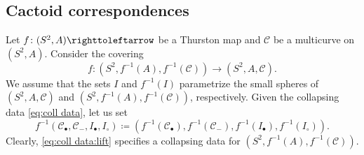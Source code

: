 \documentclass{amsart}
\theoremstyle{plain}
\theoremstyle{definition}
\theoremstyle{remark}
\newcommand{\CC}{{\mathcal C}}
\newcommand\selfmap{\righttoleftarrow}
\begin{document}



\subsection{Cactoid correspondences}
\label{ss:bar f}


Let $f\colon (S^2,A) \selfmap$ be a Thurston map and $\CC$ be a multicurve on $(S^2,A)$. Consider the covering 
\begin{equation}
\label{eq:preCactoid:f}
f\colon (S^2,f^{-1}(A),f^{-1}(\CC)) \to (S^2,A,\CC).
\end{equation}
We assume that the sets $I$ and $f^{-1}(I)$ parametrize the small spheres of $(S^2,A,\CC)$ and $(S^2,f^{-1}(A),f^{-1}(\CC))$, respectively. Given the collapsing data \eqref{eq:coll data}, let us set
\begin{equation}
\label{eq:coll data:lift}
f^{-1}(\CC_\bullet, \CC_- , I_\bullet , I_\circ)\coloneq (f^{-1}(\CC_\bullet), f^{-1}(\CC_-) , f^{-1}(I_\bullet),f^{-1}(I_\circ)).
\end{equation}
Clearly, \eqref{eq:coll data:lift} 
specifies a collapsing data for $(S^2,f^{-1}(A),f^{-1}(\CC))$. 
\end{document}

